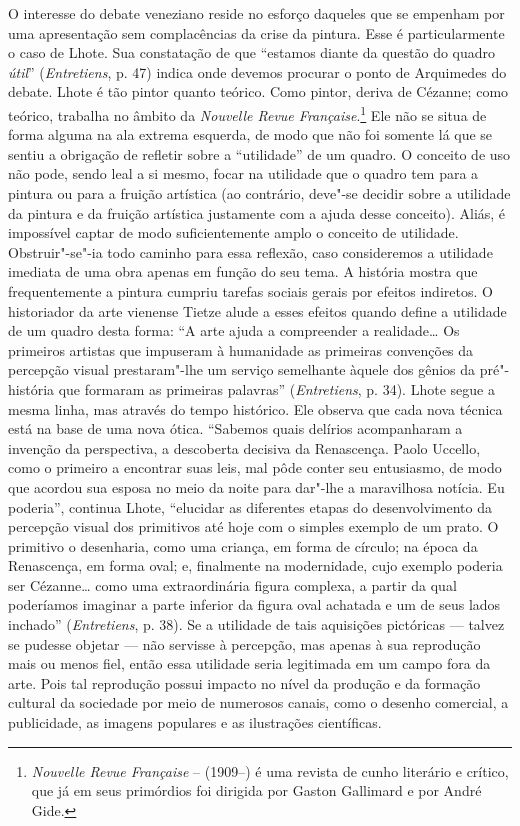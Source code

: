O interesse do debate veneziano reside no esforço daqueles que se empenham por
uma apresentação sem complacências da crise da pintura. Esse é particularmente o caso
de Lhote. Sua constatação de que ``estamos diante da questão do quadro
\emph{útil}'' (\emph{Entretiens}, p. 47) indica onde devemos
procurar o ponto de Arquimedes do debate. Lhote é tão pintor quanto
teórico. Como pintor, deriva de Cézanne; como teórico, trabalha no âmbito
da \emph{Nouvelle Revue Française}.\footnote{\emph{Nouvelle Revue
  Française} --  (1909--) é uma revista de cunho literário e
  crítico, que já em seus primórdios foi dirigida por Gaston Gallimard e
  por André Gide. \versal{[N.~O.]}} Ele não se situa de forma alguma na ala extrema
esquerda, de modo que não foi somente lá que se sentiu a obrigação de refletir sobre
a ``utilidade'' de um quadro. O conceito de uso não pode, sendo leal a si
mesmo, focar na utilidade que o quadro tem para a pintura ou para a
fruição artística (ao contrário, deve"-se decidir sobre a utilidade da pintura e da fruição artística justamente com a ajuda desse conceito). Aliás, é impossível captar de modo
suficientemente amplo o conceito de utilidade. Obstruir"-se"-ia todo
caminho para essa reflexão, caso consideremos a utilidade imediata de uma
obra apenas em função do seu tema. A história mostra que frequentemente a pintura
cumpriu tarefas sociais gerais por efeitos indiretos.
O historiador da arte vienense Tietze alude a esses efeitos quando define
a utilidade de um quadro desta forma: ``A arte ajuda a compreender a realidade\ldots{}
Os primeiros artistas que impuseram à humanidade as primeiras convenções
da percepção visual prestaram"-lhe um serviço semelhante àquele dos
gênios da pré"-história que formaram as primeiras palavras''
(\emph{Entretiens}, p. 34). Lhote segue a mesma linha, mas através do tempo
histórico. Ele observa que cada nova técnica está na base de uma nova
ótica. ``Sabemos quais delírios acompanharam a invenção da perspectiva,
a descoberta decisiva da Renascença. Paolo Uccello, como o primeiro a
encontrar suas leis, mal pôde conter seu entusiasmo, de modo que acordou
sua esposa no meio da noite para dar"-lhe a maravilhosa notícia. Eu
poderia'', continua Lhote, ``elucidar as diferentes etapas do
desenvolvimento da percepção visual dos primitivos até hoje com o
simples exemplo de um prato. O primitivo o desenharia, como uma
criança, em forma de círculo; na época da Renascença, em forma oval; e,
finalmente na modernidade, cujo exemplo poderia ser Cézanne\ldots{} como
uma extraordinária figura complexa, a partir da qual poderíamos
imaginar a parte inferior da figura oval achatada e um de seus lados
inchado'' (\emph{Entretiens}, p. 38). Se a utilidade de tais aquisições
pictóricas --- talvez se pudesse objetar --- não servisse à percepção, mas
apenas à sua reprodução mais ou menos fiel, então essa utilidade seria
legitimada em um campo fora da arte. Pois tal reprodução
possui impacto no nível da produção e da formação cultural da sociedade
por meio de numerosos canais, como o desenho comercial, a
publicidade, as imagens populares e as ilustrações científicas.

